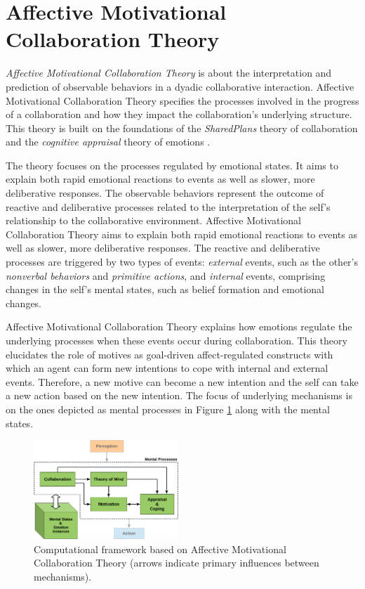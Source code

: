 \documentclass[journal, 11pt]{IEEEtran}
\begin{document}
\section{{\fontsize{11.5}{9}\selectfont Affective Motivational Collaboration
Theory}}
\label{sec:amct}

\textit{Affective Motivational Collaboration Theory}
\cite{shayganfar:theory-overview} is about the interpretation and prediction of
observable behaviors in a dyadic collaborative interaction. Affective
Motivational Collaboration Theory specifies the processes involved in the
progress of a collaboration and how they impact the collaboration's underlying
structure. This theory is built on the foundations of the \textit{SharedPlans}
theory of collaboration \cite{grosz:plans-discourse} and the \textit{cognitive
appraisal} theory of emotions \cite{gratch:domain-independent}.

The theory focuses on the processes regulated by emotional states. It aims to
explain both rapid emotional reactions to events as well as slower, more
deliberative responses. The observable behaviors represent the outcome of
reactive and deliberative processes related to the interpretation of the self's
relationship to the collaborative environment. Affective Motivational
Collaboration Theory aims to explain both rapid emotional reactions to events as
well as slower, more deliberative responses. The reactive and deliberative
processes are triggered by two types of events: \textit{external} events, such
as the other's \textit{nonverbal behaviors} and \textit{primitive actions}, and
\textit{internal} events, comprising changes in the self's mental states, such
as belief formation and emotional changes.

Affective Motivational Collaboration Theory explains how emotions regulate the
underlying processes when these events occur during collaboration. This theory
elucidates the role of motives as goal-driven affect-regulated constructs with
which an agent can form new intentions to cope with internal and external
events. Therefore, a new motive can become a new intention and the self can take
a new action based on the new intention.  The focus of underlying mechanisms is
on the ones depicted as mental processes in Figure \ref{fig:cpm} along with the
mental states.

\begin{figure}[tbh]
  \centering
  \includegraphics[width=0.485\textwidth]{figs/theory-general-croped.pdf}
  \caption{{\fontsize{10}{10}\selectfont Computational framework based on
  Affective Motivational Collaboration Theory (arrows indicate primary
  influences between mechanisms).}}
  \label{fig:cpm}
\end{figure}
\end{document}
